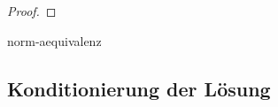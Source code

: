 \begin{proof}
  
\end{proof}


\begin{Satz}{norm-aequivalenz}
  
\end{Satz}

\subsection{Konditionierung der Lösung}


